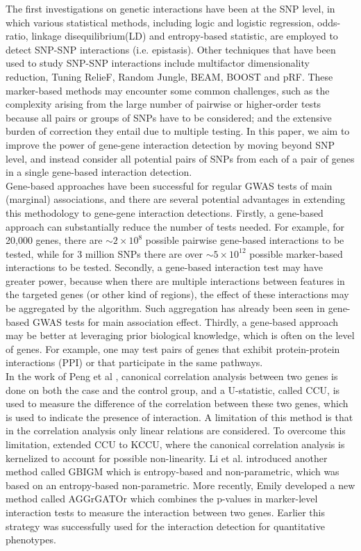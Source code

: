 \documentclass[11pt]{article}
\theoremstyle{plain}
\theoremstyle{definition}
\theoremstyle{remark}
\begin{document}
The first investigations on genetic interactions have been at the SNP level, in which various statistical methods, including logic and logistic regression, odds-ratio, linkage disequilibrium(LD) and entropy-based statistic, are employed to detect SNP-SNP interactions (i.e. epistasis). Other techniques that have been used to study SNP-SNP interactions include multifactor dimensionality reduction, Tuning RelieF, Random Jungle, BEAM, BOOST\cite{1} and pRF\cite{2}. These marker-based methods may encounter some common challenges, such as the complexity arising from the large number of pairwise or higher-order tests because all pairs or groups of SNPs have to be considered; and the extensive burden of correction they entail due to multiple testing. In this paper, we aim to improve the power of gene-gene interaction detection by moving beyond SNP level, and instead consider all potential pairs of SNPs from each of a pair of genes in a single gene-based interaction detection.\\

Gene-based approaches have been successful for regular GWAS tests of main (marginal) associations, and there are several potential advantages in extending this methodology to gene-gene interaction detections. Firstly, a gene-based approach can substantially reduce the number of tests needed. For example, for 20,000 genes, there are $\sim 2\times 10^8$ possible pairwise gene-based interactions to be tested, while for 3 million SNPs there are over $\sim 5\times 10^{12}$ possible marker-based interactions to be tested. Secondly, a gene-based interaction test may have greater power, because when there are multiple interactions between features in the targeted genes (or other kind of regions), the effect of these interactions may be aggregated by the algorithm. Such aggregation has already been seen in gene-based GWAS tests for main association effect. Thirdly, a gene-based approach may be better at leveraging prior biological knowledge, which is often on the level of genes. For example, one may test pairs of genes that exhibit protein-protein interactions (PPI) or that participate in the same pathways.\\


In the work of Peng et al \cite{3}, canonical correlation analysis between two genes is done on both the case and the control group, and a U-statistic, called CCU, is used to measure the difference of the correlation between these two genes, which is used to indicate the presence of interaction. A limitation of this method is that in the correlation analysis only linear relations are considered. To overcome this limitation, \cite{4,5} extended CCU to KCCU, where the canonical correlation analysis is kernelized to account for possible non-linearity. Li et al. \cite{6} introduced another method called GBIGM which is entropy-based and non-parametric, which was based on an entropy-based non-parametric. More recently, Emily \cite{7} developed a new method called AGGrGATOr which combines the p-values in marker-level interaction tests to measure the interaction between two genes. Earlier\cite{8} this strategy was successfully used for the interaction detection for quantitative phenotypes.\\
\end{document}
